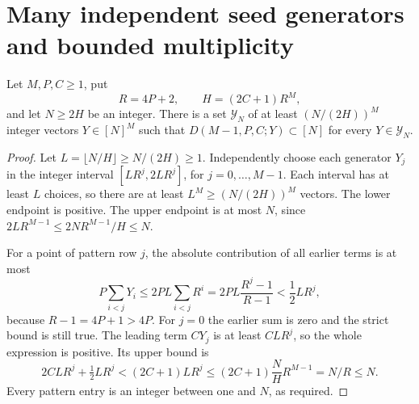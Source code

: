 \section{Many independent seed generators and bounded multiplicity}

\begin{lemma}
\label{qr:positive-box}
\leanok
{}
Let $M,P,C\geq1$, put
\[
 R=4P+2,\qquad H=(2C+1)R^M,
\]
and let $N\geq2H$ be an integer.  There is a set $\mathcal Y_N$ of at
least $(N/(2H))^M$ integer vectors $Y\in[N]^M$ such that
$D(M-1,P,C;Y)\subset[N]$ for every $Y\in\mathcal Y_N$.
\end{lemma}
\begin{proof}
Let $L=\lfloor N/H\rfloor\geq N/(2H)\geq1$.
Independently choose each generator $Y_j$ in the integer interval
$[LR^j,2LR^j]$, for $j=0,\ldots,M-1$.
Each interval has at least $L$ choices, so there are at least
$L^M\geq(N/(2H))^M$ vectors.
The lower endpoint is positive.  The upper endpoint is at most $N$, since
$2LR^{M-1}\leq2NR^{M-1}/H\leq N$.

For a point of pattern row $j$, the absolute contribution of all earlier
terms is at most
\[
 P\sum_{i<j}Y_i\leq2PL\sum_{i<j}R^i
   =2PL\frac{R^j-1}{R-1}<\frac12 LR^j,
\]
because $R-1=4P+1>4P$.  For $j=0$ the earlier sum is zero and the strict
bound is still true.
The leading term $CY_j$ is at least $CLR^j$, so the whole expression is
positive.  Its upper bound is
\[
 2CLR^j+\tfrac12LR^j
 <(2C+1)LR^j
 \leq(2C+1)\frac NH R^{M-1}=N/R\leq N.
\]
Every pattern entry is an integer between one and $N$, as required.
\end{proof}

